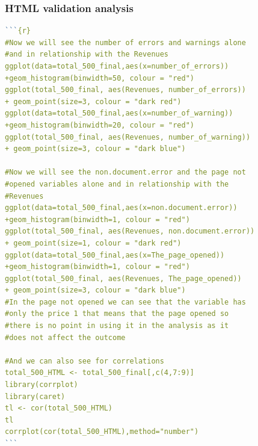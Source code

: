 \documentclass{book}
\begin{document}
\subsubsection{HTML validation analysis}\label{r: van: HTML}
\begin{lstlisting}[language=R]  
```{r}
#Now we will see the number of errors and warnings alone 
#and in relationship with the Revenues
ggplot(data=total_500_final,aes(x=number_of_errors))
+geom_histogram(binwidth=50, colour = "red")
ggplot(total_500_final, aes(Revenues, number_of_errors)) 
+ geom_point(size=3, colour = "dark red")
ggplot(data=total_500_final,aes(x=number_of_warning))
+geom_histogram(binwidth=20, colour = "red")
ggplot(total_500_final, aes(Revenues, number_of_warning)) 
+ geom_point(size=3, colour = "dark blue")

#Now we will see the non.document.error and the page not 
#opened variables alone and in relationship with the 
#Revenues
ggplot(data=total_500_final,aes(x=non.document.error))
+geom_histogram(binwidth=1, colour = "red")
ggplot(total_500_final, aes(Revenues, non.document.error)) 
+ geom_point(size=1, colour = "dark red")
ggplot(data=total_500_final,aes(x=The_page_opened))
+geom_histogram(binwidth=1, colour = "red")
ggplot(total_500_final, aes(Revenues, The_page_opened)) 
+ geom_point(size=3, colour = "dark blue")
#In the page not opened we can see that the variable has 
#only the price 1 that means that the page opened so 
#there is no point in using it in the analysis as it 
#does not affect the outcome

#And we can also see for correlations
total_500_HTML <- total_500_final[,c(4,7:9)]
library(corrplot)
library(caret)
tl <- cor(total_500_HTML)
tl
corrplot(cor(total_500_HTML),method="number")
```
\end{lstlisting} 
\end{document}
